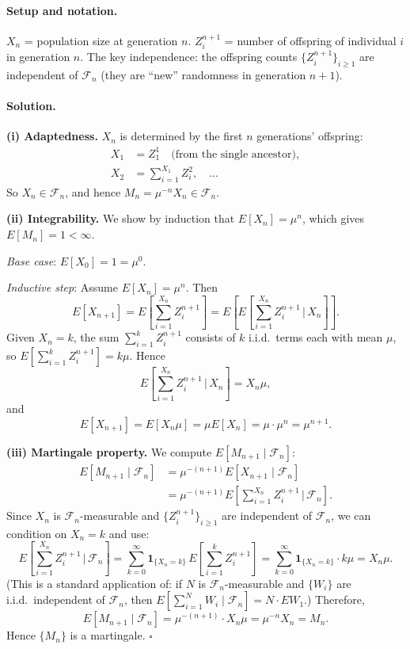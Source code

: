 \documentclass[11pt]{article}
\newcommand{\1}{\mathbf{1}}
\theoremstyle{plain}
\begin{document}
\paragraph{Setup and notation.}
$X_n$ = population size at generation $n$.
$Z_i^{n+1}$ = number of offspring of individual $i$ in generation $n$.
The key independence: the offspring counts $\{Z_i^{n+1}\}_{i\ge1}$ are
independent of $\mathcal{F}_n$ (they are ``new'' randomness in generation $n+1$).

\paragraph{Solution.}

\textbf{(i) Adaptedness.}
$X_n$ is determined by the first $n$ generations' offspring:
\begin{align*}
  X_1 &= Z_1^1 \quad\text{(from the single ancestor)}, \\
  X_2 &= \sum_{i=1}^{X_1}Z_i^2, \quad\ldots
\end{align*}
So $X_n\in\mathcal{F}_n$, and hence $M_n=\mu^{-n}X_n\in\mathcal{F}_n$.

\textbf{(ii) Integrability.}
We show by induction that $E[X_n]=\mu^n$, which gives $E[M_n]=1<\infty$.

\emph{Base case}: $E[X_0]=1=\mu^0$.

\emph{Inductive step}: Assume $E[X_n]=\mu^n$. Then
\[
  E[X_{n+1}] = E\!\left[\sum_{i=1}^{X_n}Z_i^{n+1}\right]
  = E\!\left[E\!\left[\sum_{i=1}^{X_n}Z_i^{n+1}\,\Bigg|\,X_n\right]\right].
\]
Given $X_n=k$, the sum $\sum_{i=1}^{k}Z_i^{n+1}$ consists of $k$ i.i.d.\ terms
each with mean $\mu$, so $E[\sum_{i=1}^{k}Z_i^{n+1}]=k\mu$. Hence
\[
  E\!\left[\sum_{i=1}^{X_n}Z_i^{n+1}\,\Bigg|\,X_n\right] = X_n\mu,
\]
and
\[
  E[X_{n+1}] = E[X_n\mu] = \mu E[X_n] = \mu\cdot\mu^n = \mu^{n+1}.
\]

\textbf{(iii) Martingale property.}
We compute $E[M_{n+1}\mid\mathcal{F}_n]$:
\begin{align*}
  E[M_{n+1}\mid\mathcal{F}_n]
  &= \mu^{-(n+1)}E[X_{n+1}\mid\mathcal{F}_n] \\
  &= \mu^{-(n+1)}E\!\left[\sum_{i=1}^{X_n}Z_i^{n+1}\,\Bigg|\,\mathcal{F}_n\right].
\end{align*}
Since $X_n$ is $\mathcal{F}_n$-measurable and $\{Z_i^{n+1}\}_{i\ge1}$ are
independent of $\mathcal{F}_n$, we can condition on $X_n=k$ and use:
\[
  E\!\left[\sum_{i=1}^{X_n}Z_i^{n+1}\,\Bigg|\,\mathcal{F}_n\right]
  = \sum_{k=0}^{\infty}\mathbf{1}_{\{X_n=k\}}\,E\!\left[\sum_{i=1}^{k}Z_i^{n+1}\right]
  = \sum_{k=0}^{\infty}\mathbf{1}_{\{X_n=k\}}\cdot k\mu
  = X_n\mu.
\]
(This is a standard application of: if $N$ is $\mathcal{F}_n$-measurable and
$\{W_i\}$ are i.i.d.\ independent of $\mathcal{F}_n$, then
$E[\sum_{i=1}^{N}W_i\mid\mathcal{F}_n]=N\cdot EW_1$.) Therefore,
\[
  E[M_{n+1}\mid\mathcal{F}_n]
  = \mu^{-(n+1)}\cdot X_n\mu
  = \mu^{-n}X_n = M_n.
\]
Hence $\{M_n\}$ is a martingale. $\square$
\end{document}
